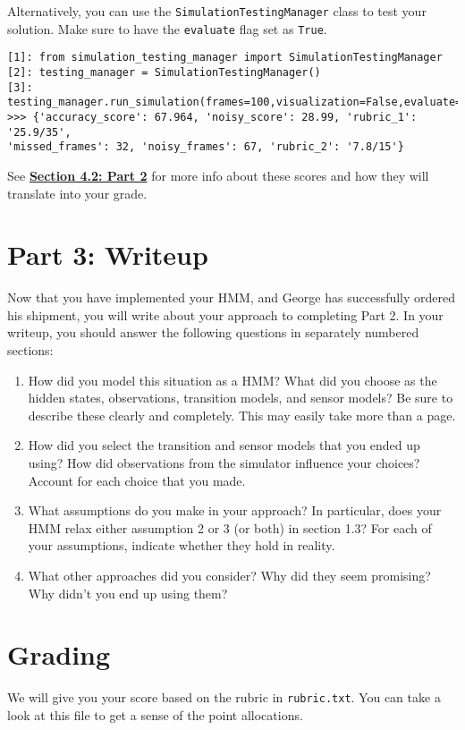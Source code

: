 \documentclass{article}
\begin{document}
    Alternatively, you can use the \texttt{SimulationTestingManager} class to test your solution. Make sure to have the \texttt{evaluate} flag set as \texttt{True}.
    
    \begin{verbatim}
[1]: from simulation_testing_manager import SimulationTestingManager
[2]: testing_manager = SimulationTestingManager()
[3]: testing_manager.run_simulation(frames=100,visualization=False,evaluate=True,save=False)
>>> {'accuracy_score': 67.964, 'noisy_score': 28.99, 'rubric_1': '25.9/35', 
'missed_frames': 32, 'noisy_frames': 67, 'rubric_2': '7.8/15'}
    \end{verbatim}
    See \hyperref[subsec:part2grading]{\textbf{Section 4.2: Part 2}} for more info about these scores and how they will translate into your grade.
    
    \section{Part 3: Writeup}
    Now that you have implemented your HMM, and George has successfully ordered his shipment, you will write about your approach to completing Part 2. In your writeup, you should answer the following questions in separately numbered sections:
    \begin{enumerate}
    \item How did you model this situation as a HMM? What did you choose as the hidden states, observations, transition models, and sensor models? Be sure to describe these clearly and completely. This may easily take more than a page.
    \item How did you select the transition and sensor models that you ended up using? How did observations from the simulator influence your choices? Account for each choice that you made.
    \item What assumptions do you make in your approach? In particular, does your HMM relax either assumption 2 or 3 (or both) in section 1.3? For each of your assumptions, indicate whether they hold in reality.
    \item What other approaches did you consider? Why did they seem promising? Why didn’t you end up using them?
    \end{enumerate}

    \section{Grading}
    We will give you your score based on the rubric in \texttt{rubric.txt}. You can take a look at this file to get a sense of the point allocations.
\end{document}
